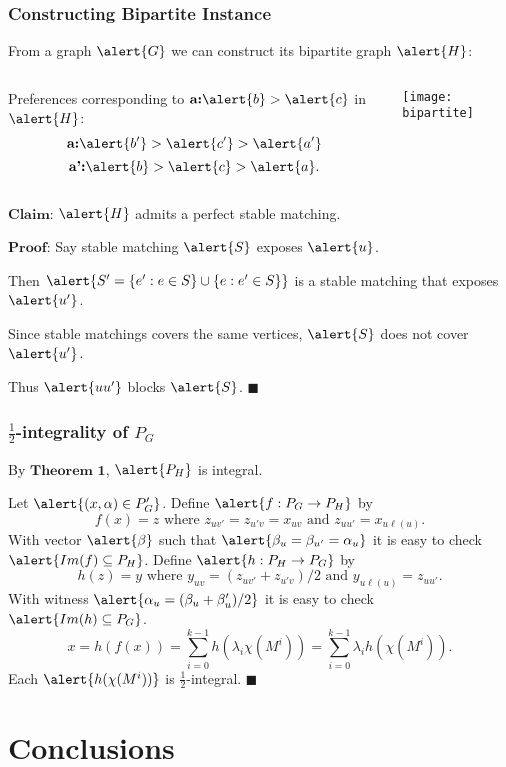 \documentclass[10pt]{beamer}
\begin{document}
\begin{frame}
\frametitle{Constructing Bipartite Instance}
\begin{center}
From a graph $\alert{G}$ we can construct its bipartite graph $\alert{H}$:
\begin{columns}[T]
\begin{column}{.48\textwidth}
\centering
Preferences corresponding to $\textbf{a:} \alert{b} > \alert{c}$ in $\alert{H}$:
$$\textbf{a:} \alert{b'} > \alert{c'} > \alert{a'}$$
$$\textbf{a':} \alert{b}>\alert{c} > \alert{a}.$$
\end{column}
\begin{column}{.48\textwidth}
\texttt{[image: bipartite]}
\end{column}
\end{columns}
\end{center}
$\textbf{Claim:}$ $\alert{H}$ admits a perfect stable matching. 

$\textbf{Proof:}$ Say stable matching $\alert{S}$ exposes $\alert{u}$.

Then $\alert{S' = \{e' : e\in S\} \cup \{e : e' \in S\}}$ is a stable matching that exposes $\alert{u'}$.

Since stable matchings covers the same vertices, $\alert{S}$ does not cover $\alert{u'}$. 

Thus $\alert{uu'}$ blocks $\alert{S}$. $\blacksquare$
\end{frame}

\begin{frame}
\frametitle{$\frac{1}{2}$-integrality of $P_G$}
By $\textbf{Theorem 1}$, $\alert{P_H}$ is integral.

Let $\alert{(x, \alpha) \in P'_G}$. Define $\alert{f: P_G \rightarrow P_H}$ by
$$f(x) = z \text{ where } z_{uv'}=z_{u'v} =x_{uv} \text{ and } z_{uu'} = x_{u\ell(u)}.$$
With vector $\alert{\beta}$ such that $\alert{\beta_u = \beta_{u'} = \alpha_u}$ it is easy to check $\alert{Im(f) \subseteq P_H}$.
Define $\alert{h: P_H \rightarrow P_G}$ by 
$$h(z) = y \text{ where } y_{uv} = (z_{uv'} + z_{u'v})/2 \text{ and } y_{u\ell(u)} = z_{uu'}.$$
With witness $\alert{\alpha_u = (\beta_u + \beta_u')/2}$ it is easy to check $\alert{Im(h) \subseteq P_G}$.
$$x = h(f(x)) = \sum_{i=0}^{k-1} h(\lambda_i \chi(M^i)) = \sum_{i=0}^{k-1} \lambda_i h(\chi(M^i)).$$
Each $\alert{h(\chi(M^i))}$ is $\frac{1}{2}$-integral. $\blacksquare$
\end{frame}
\section{Conclusions}
\end{document}
